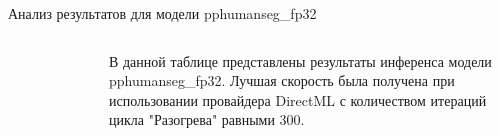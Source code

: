 \documentclass[aspectratio=169,xcolor=dvipsnames]{beamer}
\begin{document}
\begin{frame}{Анализ результатов для модели pphumanseg\_fp32}
    \begin{columns}[c] %

        \begin{figure}[h]
            \label{ris:pphumanseg}
        \end{figure}

        В данной таблице представлены результаты инференса модели pphumanseg\_fp32. Лучшая скорость была получена при использовании провайдера DirectML с количеством итераций цикла "Разогрева" равными 300.

    \end{columns}
\end{frame}

\end{document}
